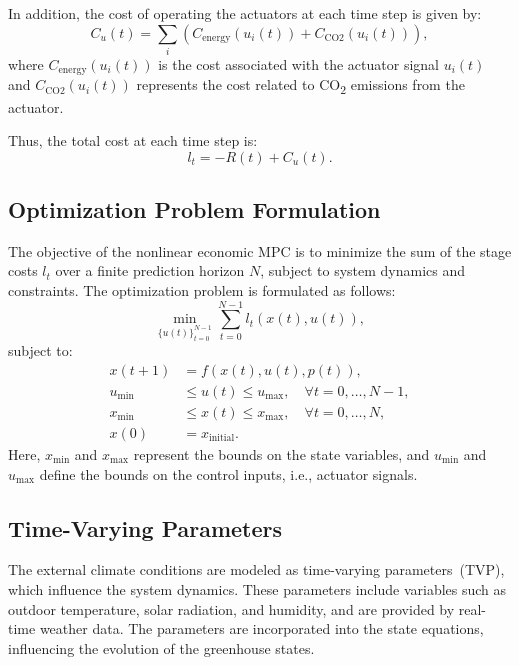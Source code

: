 \documentclass[conference]{IEEEtran}
\begin{document}
In addition, the cost of operating the actuators at each time step is given by:
\begin{equation}
    C_u(t) = \sum_{i} \left( C_{\text{energy}}(u_i(t)) + C_{\text{CO2}}(u_i(t)) \right),
\end{equation}
where \(C_{\text{energy}}(u_i(t))\) is the cost associated with the actuator signal \(u_i(t)\) and \(C_{\text{CO2}}(u_i(t))\) represents the cost related to CO\textsubscript{2} emissions from the actuator.

Thus, the total cost at each time step is:
\begin{equation}
    l_t = -R(t) + C_u(t).
\end{equation}

\subsection{Optimization Problem Formulation}

The objective of the nonlinear economic MPC is to minimize the sum of the stage costs \(l_t\) over a finite prediction horizon \(N\), subject to system dynamics and constraints. The optimization problem is formulated as follows:
\begin{equation}
    \min_{{\{u(t)\}}_{t=0}^{N-1}} \sum_{t=0}^{N-1} l_t(x(t), u(t)),
\end{equation}
subject to:
\begin{align}
    x(t+1)   & = f(x(t), u(t), p(t)),                                    \\
    u_{\min} & \leq u(t) \leq u_{\max}, \quad \forall t = 0, \dots, N-1, \\
    x_{\min} & \leq x(t) \leq x_{\max}, \quad \forall t = 0, \dots, N,   \\
    x(0)     & = x_{\text{initial}}.
\end{align}
Here, \(x_{\min}\) and \(x_{\max}\) represent the bounds on the state variables, and \(u_{\min}\) and \(u_{\max}\) define the bounds on the control inputs, i.e., actuator signals.

\subsection{Time-Varying Parameters}

The external climate conditions are modeled as time-varying parameters~(TVP), which influence the system dynamics. These parameters include variables such as outdoor temperature, solar radiation, and humidity, and are provided by real-time weather data. The parameters are incorporated into the state equations, influencing the evolution of the greenhouse states.
\end{document}
